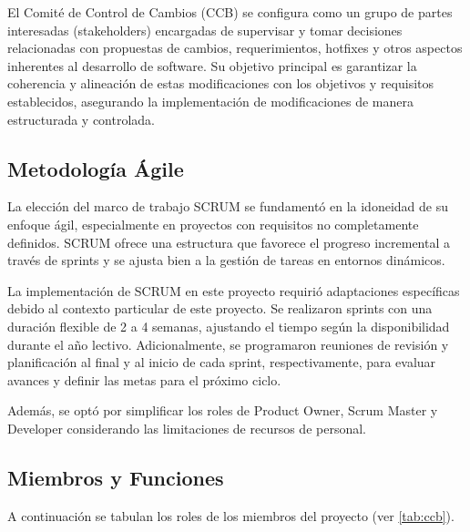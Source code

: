 El Comité de Control de Cambios (CCB) se configura como un grupo de partes interesadas (stakeholders) encargadas de supervisar y tomar decisiones relacionadas con propuestas de cambios, requerimientos, hotfixes y otros aspectos inherentes al desarrollo de software. Su objetivo principal es garantizar la coherencia y alineación de estas modificaciones con los objetivos y requisitos establecidos, asegurando la implementación de modificaciones de manera estructurada y controlada.


\subsection{Metodología Ágile}
La elección del marco de trabajo SCRUM se fundamentó en la idoneidad de su enfoque ágil, especialmente en proyectos con requisitos no completamente definidos. SCRUM ofrece una estructura que favorece el progreso incremental a través de sprints y se ajusta bien a la gestión de tareas en entornos dinámicos.

La implementación de SCRUM en este proyecto requirió adaptaciones específicas debido al contexto particular de este proyecto. Se realizaron sprints con una duración flexible de 2 a 4 semanas, ajustando el tiempo según la disponibilidad durante el año lectivo. Adicionalmente, se programaron reuniones de revisión y planificación al final y al inicio de cada sprint, respectivamente, para evaluar avances y definir las metas para el próximo ciclo.

Además, se optó por simplificar los roles de Product Owner, Scrum Master y Developer considerando las limitaciones de recursos de personal.



\subsection{Miembros y Funciones}
A continuación se tabulan los roles de los miembros del proyecto (ver \ref{tab:ccb}).


